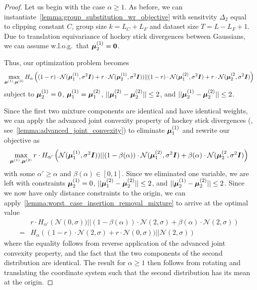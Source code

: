 \begin{proof}
    Let us begin with the case $\alpha \geq 1$.
    As before, we can instantiate~\cref{lemma:group_substitution_wr_objective} with sensitvity $\Delta_2$ equal to clipping constant $C$,
    group size $k = L_C + L_F$ and dataset size $T = L - L_F + 1$.
    Due to translation equivariance of hockey stick divergences between Gaussians, we can assume w.l.o.g.\
    that ${\bm{\mu}}^{(1)}_2 = {\bm{0}}$.

    Thus, our optimization problem becomes
    \begin{equation*}
        \max_{{\bm{\mu}}^{(1)}, {\bm{\mu}}^{(2)}} H_\alpha\left((1-r) \cdot \mathcal{N}({\bm{\mu}}^{(1)}_1, \sigma^2 {\bm{I}}) + r \cdot \mathcal{N}({\bm{\mu}}^{(1)}_2, \sigma^2 {\bm{I}}) )
                    || 
                    (1-r) \cdot \mathcal{N}({\bm{\mu}}^{(2)}_1, \sigma^2 {\bm{I}}) + r \cdot \mathcal{N}({\bm{\mu}}^{(2}_2, \sigma^2 {\bm{I}}) \right)
    \end{equation*}
    subject to ${\bm{\mu}}^{(1)}_2 = 0$, ${\bm{\mu}}^{(1)}_1 = {\bm{\mu}}^{(2)}_1$,  $||{\bm{\mu}}^{(2)}_1 - {\bm{\mu}}^{(2)}_2|| \leq 2$, and $||{\bm{\mu}}^{(1)}_2 - {\bm{\mu}}^{(2)}_2|| \leq 2$.
    
    Since the first two mixture components are identical and have identical weights, we can apply the advanced joint convexity property of hockey stick divergences (\citet{balle2018privacy}, see~\cref{lemma:advanced_joint_convexity})
    to eliminate ${\bm{\mu}}^{(1)}_1$ and rewrite our objective as
    \begin{equation*}
        \max_{{\bm{\mu}}^{(1)}, {\bm{\mu}}^{(2)}} r \cdot H_{\alpha'}\left(\mathcal{N}({\bm{\mu}}^{(1)}_1, \sigma^2 {\bm{I}}) )
                    || 
                    (1 - \beta(\alpha)) \cdot \mathcal{N}({\bm{\mu}}^{(2)}_1, \sigma^2 {\bm{I}}) + \beta(\alpha) \cdot \mathcal{N}({\bm{\mu}}^{(2}_2, \sigma^2 {\bm{I}}) \right)
    \end{equation*}
    with some $\alpha' \geq \alpha$ and $\beta(\alpha) \in [0,1]$.
    Since we eliminated one variable, we are left with constraints ${\bm{\mu}}^{(1)}_2 = 0$,  $||{\bm{\mu}}^{(2)}_1 - {\bm{\mu}}^{(2)}_2|| \leq 2$, and $||{\bm{\mu}}^{(1)}_2 - {\bm{\mu}}^{(2)}_2|| \leq 2$.
    Since we now have only distance constraints to the origin, we can apply~\cref{lemma:worst_case_insertion_removal_mixture}
    to arrive at the optimal value
    \begin{align*}
        &r \cdot H_{\alpha'}\left(\mathcal{N}(0, \sigma) )
                    || 
                    (1 - \beta(\alpha)) \cdot \mathcal{N}(2, \sigma) + \beta(\alpha) \cdot \mathcal{N}(2, \sigma) \right)
        \\
        = 
        &
        H_\alpha\left((1-r) \cdot \mathcal{N}(2, \sigma) + r \cdot \mathcal{N}(0, \sigma) )
                    || 
                    \mathcal{N}(2, \sigma)\right)
    \end{align*}
    where the equality follows from reverse application of the advanced joint convexity property, and the fact that
    the two components of the second distribution are identical.
    The result for $\alpha \geq 1$ then follows from rotating and translating the coordinate system such that the second distribution has its mean at the origin.


\end{proof}
